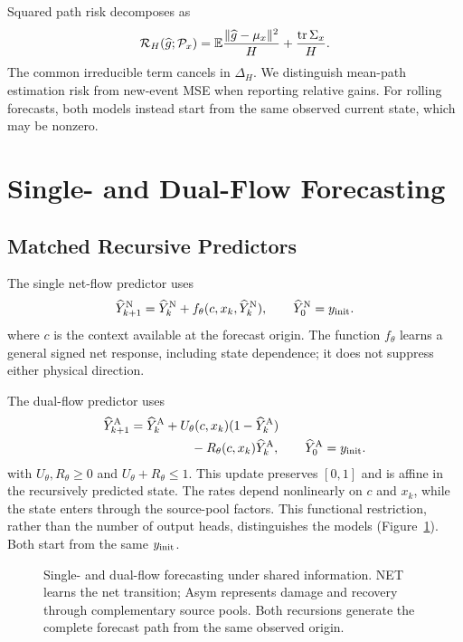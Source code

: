 Squared path risk decomposes as
\begin{equation}
 \mathcal R_H(\widehat g;\mathcal P_x)
 =\mathbb E\frac{\|\widehat g-\mu_x\|^2}{H}
 +\frac{\operatorname{tr}\Sigma_x}{H}.
 \label{eq:irreducible}
\end{equation}
The common irreducible term cancels in $\Delta_H$. We distinguish mean-path estimation risk from new-event MSE when reporting relative gains. For rolling forecasts, both models instead start from the same observed current state, which may be nonzero.

\section{Single- and Dual-Flow Forecasting}
\subsection{Matched Recursive Predictors}
The single net-flow predictor uses
\begin{equation}
 \widehat Y^{\mathrm N}_{k+1}
 =\widehat Y^{\mathrm N}_k+f_\theta(c,x_k,\widehat Y^{\mathrm N}_k),
 \qquad \widehat Y^{\mathrm N}_0=y_{\rm init}.
 \label{eq:net}
\end{equation}
where $c$ is the context available at the forecast origin. The function $f_\theta$ learns a general signed net response, including state dependence; it does not suppress either physical direction.

The dual-flow predictor uses
\begin{equation}
 \begin{split}
 \widehat Y^{\mathrm A}_{k+1}
 &=\widehat Y^{\mathrm A}_k
 +U_\theta(c,x_k)(1-\widehat Y^{\mathrm A}_k)\\
 &\hspace{17mm}-R_\theta(c,x_k)\widehat Y^{\mathrm A}_k,
 \qquad \widehat Y^{\mathrm A}_0=y_{\rm init}.
 \end{split}
 \label{eq:asym}
\end{equation}
with $U_\theta,R_\theta\ge0$ and $U_\theta+R_\theta\le1$. This update preserves $[0,1]$ and is affine in the recursively predicted state. The rates depend nonlinearly on $c$ and $x_k$, while the state enters through the source-pool factors. This functional restriction, rather than the number of output heads, distinguishes the models (Figure~\ref{fig:models}). Both start from the same $y_{\rm init}$.

\begin{figure}[!t]
\centering
{}
\caption{Single- and dual-flow forecasting under shared information. NET learns the net transition; Asym represents damage and recovery through complementary source pools. Both recursions generate the complete forecast path from the same observed origin.}
\label{fig:models}
\end{figure}

